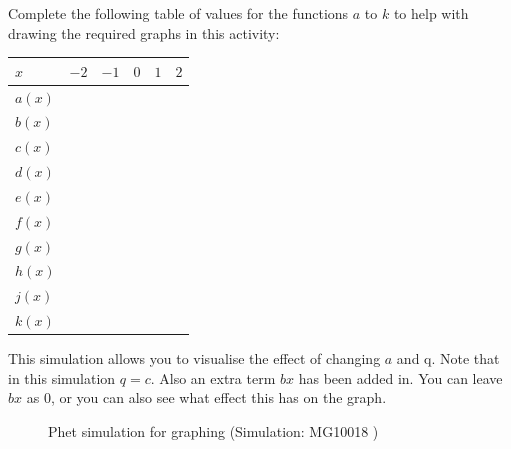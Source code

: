 Complete the following table of values for the functions $a$ to $k$ to help with drawing the required graphs in this activity:\par 
\begin{table}[H]
\begin{center}
\label{m39345*id240930}
\noindent

\begin{tabular}{|l|l|l|l|l|l|}\hline
$x$&
$-2$&
$-1$&
$0$&
$1$&
$2$
\\ \hline

$a(x)$&
&
&
&
&
\\ \hline

$b(x)$&
&
&
&
&
\\ \hline

$c(x)$
&
&
&
&
&
\\ \hline

$d(x)$
&
&
&
&
&
\\ \hline

$e(x)$
&
&
&
&
&
\\ \hline

$f(x)$
&
&
&
&
&
\\ \hline

$g(x)$
&
&
&
&
&
\\ \hline

$h(x)$
&
&
&
&
&
\\ \hline

$j(x)$
&
&
&
&
&
\\ \hline

$k(x)$
&
&
&
&
&
\\ \hline

\end{tabular}
\end{center}
\end{table}
\par
This simulation allows you to visualise the effect of changing $a$ and q. Note that in this simulation $q = c$. Also an extra term $bx$ has been added in. You can leave $bx$ as $0$, or you can also see what effect this has on the graph.
\par 
\setcounter{subfigure}{0}
\begin{figure}[H] %
\textnormal{Phet simulation for graphing}\vspace{.1in} \nopagebreak
\label{m39345*phet!!!underscore!!!sim}\label{m39345*phet-simulation}
 { (Simulation:  MG10018 )}
\vspace{2pt}
\vspace{.1in}
\end{figure}       

